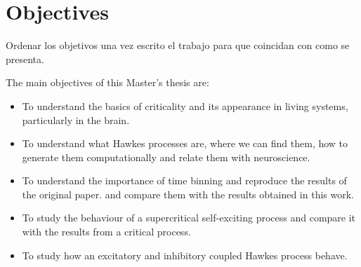 \chapter{Objectives} \label{ch:objectives}
Ordenar los objetivos una vez escrito el trabajo para que coincidan con como se presenta. 

The main objectives of this Master's thesis are:

\begin{itemize}
    \item To understand the basics of criticality and its appearance in living systems, particularly in the brain. 
    \item To understand what Hawkes processes are, where we can find them, how to generate them computationally and relate them with neuroscience.
    \item To understand the importance of time binning and reproduce the results of the original paper.
    \cite{notarmuzi2021percolation} and compare them with the results obtained in this work.
    \item To study the behaviour of a supercritical self-exciting process and compare it with the results from a critical process. 
    \item To study how an excitatory and inhibitory coupled Hawkes process behave.
\end{itemize}